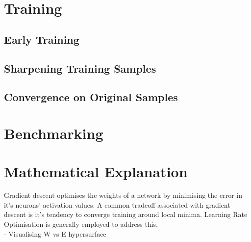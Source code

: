 \documentclass[12pt]{article}
\begin{document}
\begin{multicols}{2}
		\section{Training}
			\subsection{Early Training}
			\subsection{Sharpening Training Samples}
			\subsection{Convergence on Original Samples}
			
		\section{Benchmarking}
		
		\section{Mathematical Explanation}
		Gradient descent optimises the weights of a network by minimising the error in it's neurons' activation values. A common tradeoff associated with gradient descent is it's tendency to converge training around local minima. Learning Rate Optimisation is generally employed to address this.
		\\
		- Visualising W vs E hypersurface
		
	\end{multicols}

	\begin{multicols}{2}
		
	\end{multicols}
	
	
	
	
	
\end{document}
